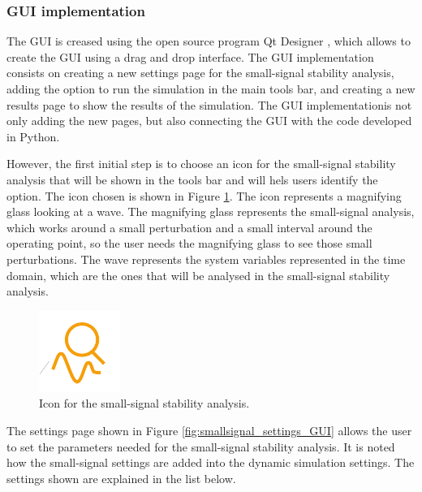 \subsubsection{GUI implementation}

The GUI is creased using the open source program Qt Designer \cite{qt_designer}, which allows to create the GUI using a drag 
and drop interface. The GUI implementation consists on creating a new settings page for the small-signal stability analysis,
adding the option to run the simulation in the main tools bar, and creating a new results page to show the results of the simulation. 
The GUI implementationis not only adding the new pages, but also connecting the GUI with the code developed in Python.

However, the first initial step is to choose an icon for the small-signal stability analysis that will be shown in the tools bar and will 
hels users identify the option. The icon chosen is shown in Figure \ref{fig:small_signal_icon}. The icon represents a magnifying glass 
looking at a wave. The magnifying glass represents the small-signal analysis, which works around a small perturbation and a small interval
around the operating point, so the user needs the magnifying glass to see those small perturbations. The wave represents the system variables
represented in the time domain, which are the ones that will be analysed in the small-signal stability analysis.

\begin{figure}[H]
  \centering
  \includegraphics[width=0.25\linewidth]{inkscape_svg/small_signal_icon.pdf}
  \caption{Icon for the small-signal stability analysis.}
  \label{fig:small_signal_icon}
\end{figure}

The settings page shown in Figure \ref{fig:smallsignal_settings_GUI} allows the user to set the parameters needed for the small-signal stability analysis.
It is noted how the small-signal settings are added into the dynamic simulation settings. The settings shown are explained in the list below.

